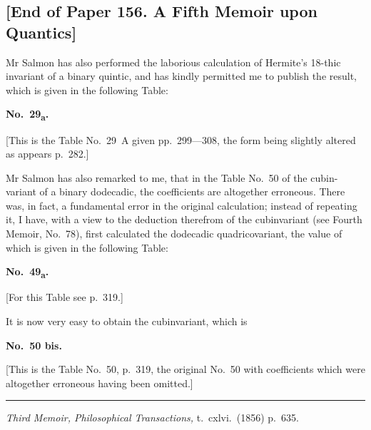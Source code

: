 \documentclass[11pt,a4paper]{book}
\begin{document}
\begin{center}
\noindent\hrulefill

\section*{[End of Paper 156. A Fifth Memoir upon Quantics]}

Mr Salmon has also performed the laborious calculation of Hermite's 18-thic
invariant of a binary quintic, and has kindly permitted me to publish the result, which
is given in the following Table:

\begin{center}\textbf{No.~29\textsubscript{a}.}\end{center}

[This is the Table No.~29~A given pp.~299---308, the form being slightly
altered as appears p.~282.]

Mr Salmon has also remarked to me, that in the Table No.~50 of the cubin-
variant of a binary dodecadic, the coefficients are altogether erroneous. There was, in
fact, a fundamental error in the original calculation; instead of repeating it, I have,
with a view to the deduction therefrom of the cubinvariant (see Fourth Memoir,
No.~78), first calculated the dodecadic quadricovariant, the value of which is given in
the following Table:

\begin{center}\textbf{No.~49\textsubscript{a}.}\end{center}

[For this Table see p.~319.]

It is now very easy to obtain the cubinvariant, which is

\begin{center}\textbf{No.~50 bis.}\end{center}

[This is the Table No.~50, p.~319, the original No.~50 with coefficients which
were altogether erroneous having been omitted.]

\medskip
\noindent\rule{0.3\textwidth}{0.4pt}

\begin{flushright}
\textit{Third Memoir, Philosophical Transactions,} t.~cxlvi.~(1856) p.~635.
\end{flushright}


\end{center}
\end{document}
